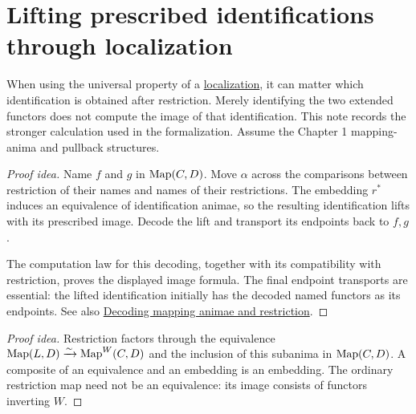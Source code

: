 \documentclass[11pt]{article}
\begin{document}
\section*{Lifting prescribed identifications through localization}

When using the universal property of a
\href{localizations.html}{localization}, it can matter which identification
is obtained after restriction. Merely identifying the two extended functors
does not compute the image of that identification. This note records the
stronger calculation used in the formalization.
Assume the Chapter 1 mapping-anima and pullback structures.

\begin{proof}[Proof idea]
Name $f$ and $g$ in $\operatorname{Map}(C,D)$. Move $\alpha$ across the comparisons
between restriction of their names and names of their restrictions.
The embedding $r^*$ induces an equivalence of identification animae,
so the resulting identification lifts with its prescribed image.
Decode the lift and transport its endpoints back to $f,g$.

The computation law for this decoding, together with its compatibility
with restriction, proves the displayed image formula. The final endpoint
transports are essential: the lifted identification initially has the
decoded named functors as its endpoints. See also
\href{supplementary-decoding-and-restriction.html}{Decoding mapping animae
and restriction}.
\end{proof}

\begin{proof}[Proof idea]
Restriction factors through the equivalence
$\operatorname{Map}(L,D)\xrightarrow{\sim}\operatorname{Map}^W(C,D)$ and the inclusion of this subanima in
$\operatorname{Map}(C,D)$. A composite of an equivalence and an embedding is an
embedding. The ordinary restriction map need not be an equivalence:
its image consists of functors inverting $W$.
\end{proof}
\end{document}

